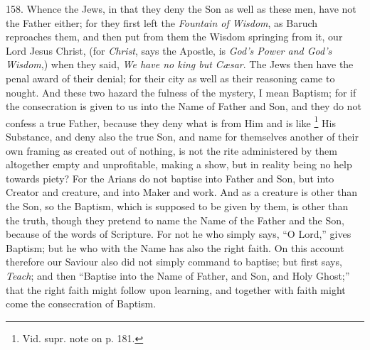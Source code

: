 158. Whence the Jews, in that
they deny the Son as well as these men, have not the Father either;
for they first left the \emph{Fountain of Wisdom}, as Baruch
reproaches them, and then put from them the Wisdom springing from it,
our Lord Jesus Christ, (for \emph{Christ}, says the Apostle, is \emph{God's
Power and God's Wisdom},) when they said, \emph{We have no king but Cæsar}.
The Jews then have the penal award of their denial; for their city as
well as their reasoning came to nought. And these two hazard the
fulness of the mystery, I mean Baptism; for if the consecration
is given to us into the Name of Father and Son, and they do not
confess a true Father, because they deny what is from Him and is like
\footnote{Vid. supr. note on p. 181.} His Substance, and deny
also the true Son, and name for themselves another of their own
framing as created out of nothing, is not the rite administered by
them altogether empty and unprofitable, making a show, but in reality
being no help towards piety? For the Arians do not baptise into Father
and Son, but into Creator and creature, and into Maker and work. And
as a creature is other than the Son, so the Baptism, which is supposed
to be given by them, is other than the truth, though they pretend to
name the Name of the Father and the Son, because of the words of
Scripture. For not he who simply says, ``O Lord,'' gives Baptism; but he
who with the Name has also the right faith. On this account therefore
our Saviour also did not simply command to baptise; but first says, \emph{Teach};
and then ``Baptise into the Name of Father, and Son, and Holy
Ghost;'' that the right faith might follow upon learning, and together
with faith might come the consecration of Baptism.

